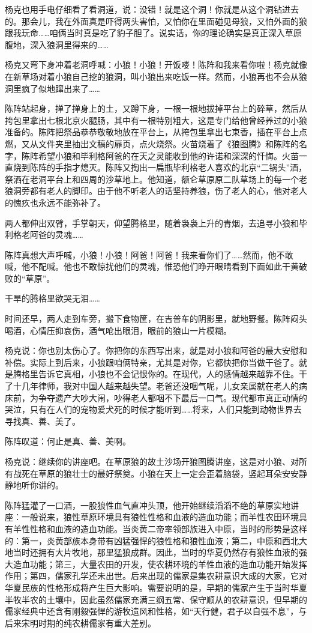 \par 杨克也用手电仔细看了看洞道，说：没错！就是这个洞！你就是从这个洞钻进去的。那会儿，我在外面真是吓得两头害怕，又怕你在里面碰见母狼，又怕外面的狼跟我玩命……咱俩当时真是吃了豹子胆了。说实话，你的理论确实是真正深入草原腹地，深入狼洞里得来的……
\par 杨克又弯下身冲着老洞呼喊：小狼！小狼！开饭喽！陈阵和我来看你啦！杨克就像在新草场对着小狼自己挖的狼洞，叫小狼出来吃饭一样。然而，小狼再也不会从狼洞里疯了似地蹿出来了……
\par 陈阵站起身，掸了掸身上的土，又蹲下身，一根一根地拔掉平台上的碎草，然后从挎包里拿出七根北京火腿肠，其中有一根特别粗大，这是专门给他曾经养过的小狼准备的。陈阵把祭品恭恭敬敬地放在平台上，从挎包里拿出七束香，插在平台上点燃，又从文件夹里抽出文稿的扉页，点火烧祭。火苗烧着了《狼图腾》和陈阵的名字，陈阵希望小狼和毕利格阿爸的在天之灵能收到他的许诺和深深的忏悔。火苗一直烧到陈阵的手指才熄灭。陈阵又掏出一扁瓶毕利格老人喜欢的北京“二锅头”酒，祭洒在老洞平台上和四周的沙草地上。他知道，额仑草原原二队草场上的每一个老狼洞旁都有老人的脚印。由于他不听老人的话坚持养狼，伤了老人的心，他对老人的愧疚也永远不能弥补了。
\par 两人都伸出双臂，手掌朝天，仰望腾格里，随着袅袅上升的青烟，去追寻小狼和毕利格老阿爸的灵魂……
\par 陈阵真想大声呼喊，小狼！小狼！阿爸！阿爸！我来看你们了……然而，他不敢喊，他不配喊。他也不敢惊扰他们的灵魂，惟恐他们睁开眼睛看到下面如此干黄破败的“草原”。
\par 干旱的腾格里欲哭无泪……
\par 
\par 时间还早，两人走到车旁，搬下食物筐，在吉普车的阴影里，就地野餐。陈阵闷头喝酒，心情压抑哀伤，酒气呛出眼泪，眼前的狼山一片模糊。
\par 杨克说：你也别太伤心了。你把你的东西写出来，就是对小狼和阿爸的最大安慰和补偿。实际上到后来，小狼跟咱俩特亲，尤其是对你，它都快把你当做干爸了。就是腾格里告诉它真相，小狼也不会记恨你的。在现代，人的感情越来越靠不住。干了十几年律师，我对中国人越来越失望。老爸还没咽气呢，儿女亲属就在老人的病床前，为争夺遗产大吵大闹，吵得老人都咽不下最后一口气。现代都市真正动情的哭泣，只有在人们的宠物爱犬死的时候才能听到……将来，人们只能到动物世界去寻找真、善、美了。
\par 陈阵叹道：何止是真、善、美啊。
\par 杨克说：继续你的讲座吧。在草原狼的故土沙场开狼图腾讲座，这是对小狼、对所有战死在草原的狼壮士的最好祭奠。小狼在天上一定会歪着脑袋，竖起耳朵安安静静地听你讲的。
\par 陈阵猛灌了一口酒，一股狼性血气直冲头顶，他开始继续滔滔不绝的草原实地讲座：一般说来，狼性草原环境具有狼性性格和血液的造血功能；而羊性农田环境具有羊性性格和血液的造血功能。当炎黄二帝率领部族进入中原，当时的形势是这样的：第一，炎黄部族本身带有凶猛强悍的狼性格和狼性血液；第二，中原和西北大地当时还拥有大片牧地，那里猛狼成群。因此，当时的华夏仍然存有狼性血液的强大造血功能；第三，大量农田的开发，使农耕环境的羊性血液的造血功能开始发挥作用；第四，儒家孔学还未出世。后来出现的儒家是集农耕意识大成的大家，它对华夏民族的性格形成将产生巨大影响。需要说明的是，早期的儒家产生于当时华夏半牧半农的土壤中，因此虽然儒家充满三纲五常、保守顺从的农耕意识，但早期的儒家经典中还含有刚毅强悍的游牧遗风和性格，如“天行健，君子以自强不息”，与后来宋明时期的纯农耕儒家有重大差别。
